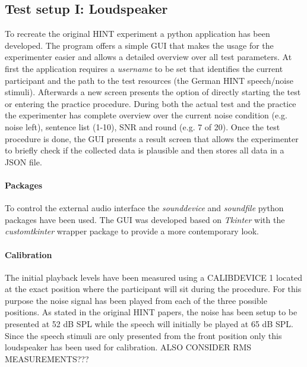\documentclass[a4paper,11pt]{article}%
\renewcommand{\\}{\vspace*{0.5\baselineskip} \newline}
\begin{document}
\subsection{Test setup I: Loudspeaker}
To recreate the original \ac{HINT} experiment a python application has been developed. The program offers a simple \ac{GUI} that makes the usage for the experimenter easier and allows a detailed overview over all test parameters. At first the application requires a \textit{username} to be set that identifies the current participant and the path to the test resources (the German \ac{HINT} speech/noise stimuli). Afterwards a new screen presents the option of directly starting the test or entering the practice procedure. During both the actual test and the practice the experimenter has complete overview over the current noise condition (e.g. \dq noise left\dq{}), sentence list (1-10), \ac{SNR} and round (e.g. 7 of 20).
\newline
\newline
Once the test procedure is done, the \ac{GUI} presents a result screen that allows the experimenter to briefly check if the collected data is plausible and then stores all data in a \ac{JSON} file.

\paragraph{Packages} To control the external audio interface the \textit{sounddevice} and \textit{soundfile} python packages have been used. The \ac{GUI} was developed based on \textit{Tkinter} with the \textit{customtkinter} wrapper package to provide a more contemporary look.

\paragraph{Calibration} The initial playback levels have been measured using a CALIBDEVICE 1 located at the exact position where the participant will sit during the procedure. For this purpose the noise signal has been played from each of the three possible positions. As stated in the original \ac{HINT} papers, the noise has been setup to be presented at 52 dB \acs{SPL} while the speech will initially be played at 65 dB \ac{SPL}. Since the speech stimuli are only presented from the \dq front\dq{} position only this loudspeaker has been used for calibration.
\newline
\newline
ALSO CONSIDER RMS MEASUREMENTS???
\end{document}
